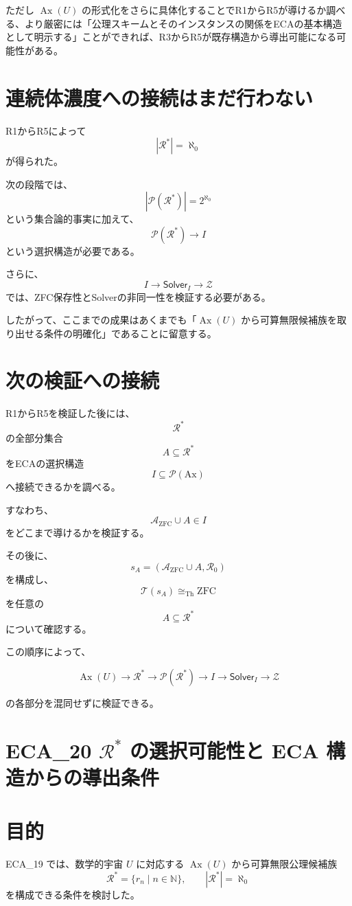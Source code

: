 \documentclass[a4paper,11pt]{article}
\newcommand{\Ax}{\mathrm{Ax}}
\newcommand{\Solver}{\mathsf{Solver}}
\newcommand{\ZFC}{\mathrm{ZFC}}
\begin{document}
ただし $\operatorname{Ax}(U)$ の形式化をさらに具体化することでR1からR5が導けるか調べる、より厳密には「公理スキームとそのインスタンスの関係をECAの基本構造として明示する」ことができれば、R3からR5が既存構造から導出可能になる可能性がある。

\section{連続体濃度への接続はまだ行わない}

R1からR5によって
\[
|\mathcal{R}^*|=\aleph_0
\]
が得られた。

次の段階では、
\[
|\mathcal{P}(\mathcal{R}^*)|
=
2^{\aleph_0}
\]
という集合論的事実に加えて、
\[
\mathcal{P}(\mathcal{R}^*)\to I
\]
という選択構造が必要である。

さらに、
\[
I\to\Solver_I\to\mathcal{Z}
\]
では、ZFC保存性とSolverの非同一性を検証する必要がある。

したがって、ここまでの成果はあくまでも「$\operatorname{Ax}(U)$ から可算無限候補族を取り出せる条件の明確化」であることに留意する。

\section{次の検証への接続}

R1からR5を検証した後には、
\[
\mathcal{R}^*
\]
の全部分集合
\[
A\subseteq\mathcal{R}^*
\]
をECAの選択構造
\[
I\subseteq\mathcal{P}(\Ax)
\]
へ接続できるかを調べる。

すなわち、
\[
\mathcal{A}_{\mathrm{ZFC}}\cup A\in I
\]
をどこまで導けるかを検証する。

その後に、
\[
s_A
=
(\mathcal{A}_{\mathrm{ZFC}}\cup A,\mathcal{R}_0)
\]
を構成し、
\[
\mathcal{T}(s_A)\cong_{\mathrm{Th}}\ZFC
\]
を任意の
\[
A\subseteq\mathcal{R}^*
\]
について確認する。

この順序によって、

\[
\boxed{
\operatorname{Ax}(U)
\to
\mathcal{R}^*
\to
\mathcal{P}(\mathcal{R}^*)
\to
I
\to
\Solver_I
\to
\mathcal{Z}
}
\]

の各部分を混同せずに検証できる。





\section{ECA_20 $\mathcal{R}^*$ の選択可能性と ECA 構造からの導出条件}


\section{目的}
ECA_19 では、数学的宇宙 $U$ に対応する
$\operatorname{Ax}(U)$ から可算無限公理候補族
\[
\mathcal{R}^*=\{r_n\mid n\in\mathbb{N}\},
\qquad |\mathcal{R}^*|=\aleph_0
\]
を構成できる条件を検討した。
\end{document}

